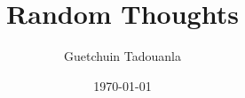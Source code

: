 \usepackage[margin=1in, top=1.2in, bottom=1.2in]{geometry}

\usepackage[T1]{fontenc}
\usepackage{lmodern}
\usepackage{microtype}

\usepackage[english]{babel}
\usepackage{amsmath, amssymb, amsthm}
\usepackage{csquotes}

\usepackage{booktabs}
\usepackage{graphicx}
\usepackage{xcolor}


\usepackage[backend=biber, style=numeric-comp, sorting=nyt, giveninits=true]{biblatex}


\usepackage[
  pdfencoding=auto,
  colorlinks=true,
  linkcolor=navyblue,
  citecolor=navyblue,
  urlcolor=navyblue
]{hyperref}

\title{Random Thoughts}
\author{Guetchuin Tadouanla}
\date{\today}
